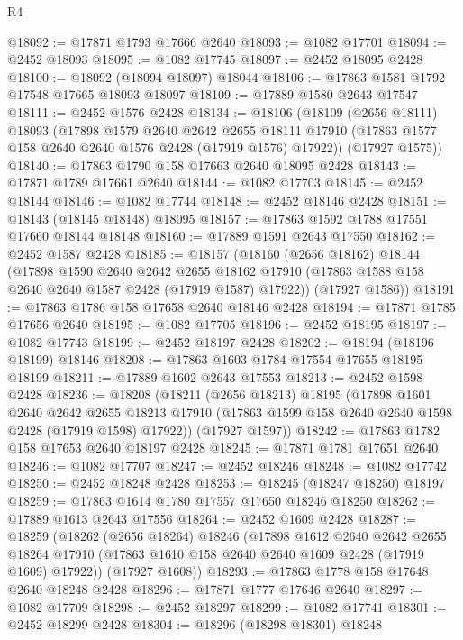 \begin{lexlean}{R4}
\begin{coremodule}
@18092 := @17871 @1793 @17666 @2640
@18093 := @1082 @17701
@18094 := @2452 @18093
@18095 := @1082 @17745
@18097 := @2452 @18095 @2428
@18100 := @18092 (@18094 @18097) @18044
@18106 := @17863 @1581 @1792 @17548 @17665 @18093 @18097
@18109 := @17889 @1580 @2643 @17547
@18111 := @2452 @1576 @2428
@18134 := @18106
    (@18109
      (@2656 @18111)
      @18093
      (@17898
        @1579
        @2640
        @2642
        @2655
        @18111
        @17910
        (@17863 @1577 @158 @2640 @2640 @1576 @2428 (@17919 @1576) @17922))
      (@17927 @1575))
@18140 := @17863 @1790 @158 @17663 @2640 @18095 @2428
@18143 := @17871 @1789 @17661 @2640
@18144 := @1082 @17703
@18145 := @2452 @18144
@18146 := @1082 @17744
@18148 := @2452 @18146 @2428
@18151 := @18143 (@18145 @18148) @18095
@18157 := @17863 @1592 @1788 @17551 @17660 @18144 @18148
@18160 := @17889 @1591 @2643 @17550
@18162 := @2452 @1587 @2428
@18185 := @18157
    (@18160
      (@2656 @18162)
      @18144
      (@17898
        @1590
        @2640
        @2642
        @2655
        @18162
        @17910
        (@17863 @1588 @158 @2640 @2640 @1587 @2428 (@17919 @1587) @17922))
      (@17927 @1586))
@18191 := @17863 @1786 @158 @17658 @2640 @18146 @2428
@18194 := @17871 @1785 @17656 @2640
@18195 := @1082 @17705
@18196 := @2452 @18195
@18197 := @1082 @17743
@18199 := @2452 @18197 @2428
@18202 := @18194 (@18196 @18199) @18146
@18208 := @17863 @1603 @1784 @17554 @17655 @18195 @18199
@18211 := @17889 @1602 @2643 @17553
@18213 := @2452 @1598 @2428
@18236 := @18208
    (@18211
      (@2656 @18213)
      @18195
      (@17898
        @1601
        @2640
        @2642
        @2655
        @18213
        @17910
        (@17863 @1599 @158 @2640 @2640 @1598 @2428 (@17919 @1598) @17922))
      (@17927 @1597))
@18242 := @17863 @1782 @158 @17653 @2640 @18197 @2428
@18245 := @17871 @1781 @17651 @2640
@18246 := @1082 @17707
@18247 := @2452 @18246
@18248 := @1082 @17742
@18250 := @2452 @18248 @2428
@18253 := @18245 (@18247 @18250) @18197
@18259 := @17863 @1614 @1780 @17557 @17650 @18246 @18250
@18262 := @17889 @1613 @2643 @17556
@18264 := @2452 @1609 @2428
@18287 := @18259
    (@18262
      (@2656 @18264)
      @18246
      (@17898
        @1612
        @2640
        @2642
        @2655
        @18264
        @17910
        (@17863 @1610 @158 @2640 @2640 @1609 @2428 (@17919 @1609) @17922))
      (@17927 @1608))
@18293 := @17863 @1778 @158 @17648 @2640 @18248 @2428
@18296 := @17871 @1777 @17646 @2640
@18297 := @1082 @17709
@18298 := @2452 @18297
@18299 := @1082 @17741
@18301 := @2452 @18299 @2428
@18304 := @18296 (@18298 @18301) @18248

\end{coremodule}
\end{lexlean}
